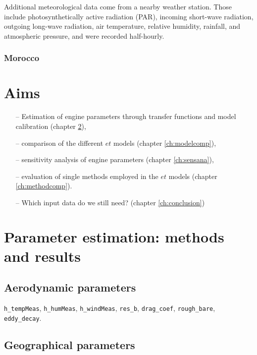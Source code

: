 \documentclass{scrreprt}
\begin{document}
Additional meteorological data come from a nearby weather station.
Those include photosynthetically active radiation (PAR), incoming short-wave radiation, outgoing long-wave radiation, air temperature, relative humidity, rainfall, and atmospheric pressure, and were recorded half-hourly.

\subsection{Morocco} \label{ssec:intro_areas_morocco}



\chapter{Aims} \label{ch:aims}

\begin{itemize}
  \item[--] Estimation of engine parameters through transfer functions and model calibration (chapter \ref{ch:parest}),
  \item[--] comparison of the different $et$ models (chapter \ref{ch:modelcomp}),
  \item[--] sensitivity analysis of engine parameters (chapter \ref{ch:sensana}),
  \item[--] evaluation of single methods employed in the $et$ models (chapter \ref{ch:methodcomp}).
  \item[--] Which input data do we still need? (chapter \ref{ch:conclusion})
\end{itemize}


\chapter{Parameter estimation: methods and results} \label{ch:parest}

\section{Aerodynamic parameters} \label{sec:parest_met}

\verb!h_tempMeas!, \verb!h_humMeas!, \verb!h_windMeas!, \verb!res_b!, \verb!drag_coef!, \verb!rough_bare!, \verb!eddy_decay!.

\section{Geographical parameters} \label{sec:parest_geo}
\end{document}
